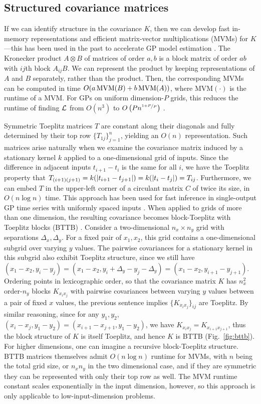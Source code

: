 \documentclass[twoside]{article}
\begin{document}
\subsection{Structured covariance matrices}

If we can identify structure in the covariance $K$, then we can develop fast in-memory representations and efficient matrix-vector multiplications (MVMs) for $K$---this has been used in the past to accelerate GP model estimation \citep{gilboa2015scaling, cunningham2008fast}. The Kronecker product $A\otimes B$ of matrices of order $a,b$ is a block matrix of order $ab$ with $ij$th block $A_{ij}B$. We can represent the product by keeping representations of $A$ and $B$ separately, rather than the product. Then, the corresponding MVMs can be computed in time $O(a\operatorname{MVM}(B)+b\operatorname{MVM}(A))$, where $\text{MVM}(\cdot)$ is the runtime of a MVM. For GPs on uniform dimension-$P$ grids, this reduces the runtime of finding $\mathcal{L}$ from $O(n^3)$ to $O\left({Pn^{\nicefrac{1+P}{P}}}\right)$ \citep{gilboa2015scaling}.

Symmetric Toeplitz matrices $T$ are constant along their diagonals and fully determined by their top row $\{T_{1j}\}_{j=1}^n$, yielding an $O(n)$ representation. Such matrices arise naturally when we examine the covariance matrix induced by a stationary kernel $k$ applied to a one-dimensional grid of inputs. Since the difference in adjacent inputs $t_{i+1}-t_{i}$ is the same for all $i$, we have the Toeplitz property that $T_{(i+1)(j+1)}=k(\left|t_{i+1} -t_{j+1}\right|)=k(\left|t_i-t_j\right|)=T_{ij}$. Furthermore, we can embed $T$ in the upper-left corner of a circulant matrix $C$ of twice its size, in $O(n\log n)$ time. This approach has been used for fast inference in single-output GP time series with uniformly spaced inputs \citep{cunningham2008fast}. When applied to grids of more than one dimension, the resulting covariance becomes block-Toeplitz with Toeplitz blocks (BTTB) \citep{msgp}. Consider a two-dimensional $n_x\times n_y$ grid with separations $\Delta_x,\Delta_y$. For a fixed pair of $x_1,x_2$, this grid contains a one-dimensional subgrid over varying $y$ values. The pairwise covariances for a stationary kernel in this subgrid also exhibit Toeplitz structure, since we still have $(x_1-x_2,y_i-y_j)=(x_1-x_2,y_i+\Delta_y-y_{j}-\Delta_y)=(x_1-x_2,y_{i+1}-y_{j+1})$. Ordering points in lexicographic order, so that the covariance matrix $K$ has $n_x^2$ order-$n_y$ blocks $K_{x_ix_j}$ with pairwise covariances between varying $y$ values between a pair of fixed $x$ values, the previous sentence implies $\{K_{x_ix_j}\}_{ij}$ are Toeplitz. By similar reasoning, since for any $y_1,y_2$, $(x_i-x_j,y_1-y_2)=(x_{i+1}-x_{j+1},y_1-y_2)$, we have $K_{x_ix_j}=K_{x_{i+1}x_{j+1}}$, thus the block structure of $K$ is itself Toeplitz, and hence $K$ is BTTB (Fig.~\ref{fig:bttb}). For higher dimensions, one can imagine a recursive block-Toeplitz structure. BTTB matrices themselves admit $O(n\log n)$ runtime for MVMs, with $n$ being the total grid size, or $n_xn_y$ in the two dimensional case, and if they are symmetric they can be represented with only their top row as well. The MVM runtime constant scales exponentially in the input dimension, however, so this approach is only applicable to low-input-dimension problems.
\end{document}
